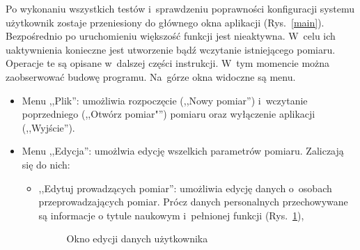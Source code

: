 \noindent Po wykonaniu wszystkich testów i~sprawdzeniu poprawności konfiguracji systemu użytkownik zostaje przeniesiony do głównego okna aplikacji (Rys.~\ref{main}). Bezpośrednio po uruchomieniu większość funkcji jest nieaktywna. W~celu ich uaktywnienia konieczne jest utworzenie bądź wczytanie istniejącego pomiaru. Operacje te są opisane w~dalszej części instrukcji. W~tym momencie można zaobserwować budowę programu. Na~górze okna widoczne są menu.
\begin{itemize}
\item Menu ,,Plik'': umożliwia rozpoczęcie (,,Nowy pomiar'') i~wczytanie poprzedniego (,,Otwórz pomiar"'') pomiaru oraz wyłączenie aplikacji (,,Wyjście'').
\item Menu ,,Edycja'': umożlwia edycję wszelkich parametrów pomiaru. Zaliczają się do nich:
\begin{itemize}
\item ,,Edytuj prowadzących pomiar'': umożliwia edycję danych o~osobach przeprowadzających pomiar. Prócz danych personalnych przechowywane są informacje o tytule naukowym i~pełnionej funkcji (Rys.~\ref{editUser}),

\begin{figure}[!htb]
\centering 		
  \hspace{2mm}
\caption{Okno edycji danych użytkownika} 	
\label{editUser}
\end{figure}


\end{itemize}
\end{itemize}
